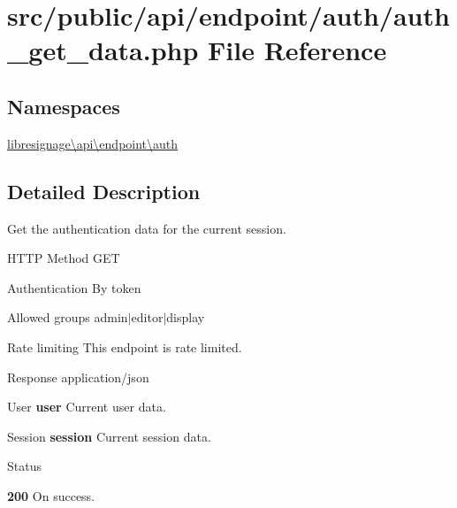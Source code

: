 \hypertarget{src_2public_2api_2endpoint_2auth_2auth__get__data_8php}{}\section{src/public/api/endpoint/auth/auth\+\_\+get\+\_\+data.php File Reference}
\label{src_2public_2api_2endpoint_2auth_2auth__get__data_8php}
\subsection*{Namespaces}
\begin{DoxyCompactItemize}
\item 
 \hyperlink{namespacelibresignage_1_1api_1_1endpoint_1_1auth}{libresignage\textbackslash{}api\textbackslash{}endpoint\textbackslash{}auth}
\end{DoxyCompactItemize}


\subsection{Detailed Description}
Get the authentication data for the current session.

\begin{DoxyParagraph}{H\+T\+TP Method}
G\+ET 
\end{DoxyParagraph}
\begin{DoxyParagraph}{Authentication}
By token 
\end{DoxyParagraph}
\begin{DoxyParagraph}{Allowed groups}
{\ttfamily admin$\vert$editor$\vert$display} 
\end{DoxyParagraph}
\begin{DoxyParagraph}{Rate limiting}
This endpoint is rate limited.
\end{DoxyParagraph}
\begin{DoxyParagraph}{Response}
application/json
\begin{DoxyItemize}
\item {\ttfamily User} {\bfseries user} Current user data.
\item {\ttfamily Session} {\bfseries session} Current session data.
\end{DoxyItemize}
\end{DoxyParagraph}
\begin{DoxyParagraph}{Status}

\begin{DoxyItemize}
\item {\bfseries 200} On success. 
\end{DoxyItemize}
\end{DoxyParagraph}
